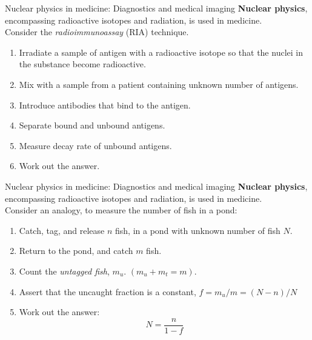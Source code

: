 \documentclass{beamer}
\begin{document}
\begin{frame}{Nuclear physics in medicine: Diagnostics and medical imaging}
\textbf{Nuclear physics}, encompassing radioactive isotopes and radiation, is used in medicine. \\ \vspace{0.5cm}
\small
Consider the \textit{radioimmunoassay} (RIA) technique.
\begin{enumerate}
\item Irradiate a sample of antigen with a radioactive isotope so that the nuclei in the substance become radioactive.
\item Mix with a sample from a patient containing unknown number of antigens.
\item Introduce antibodies that bind to the antigen.
\item Separate bound and unbound antigens.
\item Measure decay rate of unbound antigens.
\item Work out the answer.
\end{enumerate}
\end{frame}

\begin{frame}{Nuclear physics in medicine: Diagnostics and medical imaging}
\textbf{Nuclear physics}, encompassing radioactive isotopes and radiation, is used in medicine. \\ \vspace{0.5cm}
\small
Consider an analogy, to measure the number of fish in a pond:
\begin{enumerate}
\item Catch, tag, and release $n$ fish, in a pond with unknown number of fish $N$.
\item Return to the pond, and catch $m$ fish.
\item Count the \textit{untagged fish}, $m_u$.  $(m_u + m_t = m)$.
\item Assert that the uncaught fraction is a constant, $f = m_u/m = (N-n)/N$
\item Work out the answer:
\begin{equation}
N = \frac{n}{1-f}
\end{equation}
\end{enumerate}
\end{frame}
\end{document}
